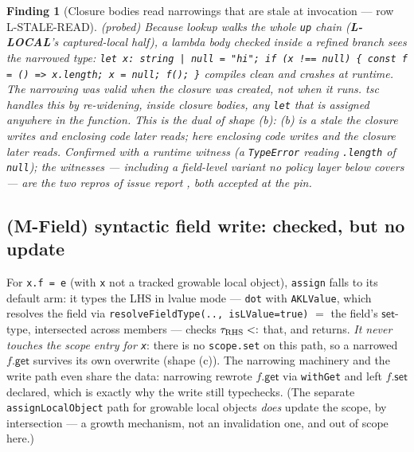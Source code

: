 \documentclass[11pt]{article}
\newtheorem{finding}[theorem]{Finding}
\begin{document}
\begin{finding}[Closure bodies read narrowings that are stale at invocation
— row L-STALE-READ]
\label{find:stale-read}
\emph{(probed)} Because lookup walks the whole \texttt{up} chain
(\textbf{L-LOCAL}'s captured-local half), a lambda body checked inside a
refined branch \emph{sees the narrowed type}:
\texttt{let x: string | null = "hi"; if (x !== null) \{ const f = () =>
x.length; x = null; f(); \}}
compiles clean and crashes at runtime. The narrowing was valid when the
closure was \emph{created}, not when it \emph{runs}. tsc handles this by
re-widening, inside closure bodies, any \texttt{let} that is assigned
anywhere in the function. This is the dual of shape (b): (b) is a stale
the closure writes and enclosing code later reads; here enclosing code
writes and the closure later reads. Confirmed with a runtime witness (a
\texttt{TypeError} reading \texttt{.length} of \texttt{null}); the
witnesses — including a field-level variant no policy layer below
covers — are the two repros of issue report
, both accepted at the
pin.
\end{finding}

\subsection{(M-Field) syntactic field write: checked, but no update}
For \texttt{x.f = e} (with \texttt{x} not a tracked growable local
object), \texttt{assign} falls to its default arm: it types the LHS in
lvalue mode — \texttt{dot} with \texttt{AKLValue}, which resolves the
field via \texttt{resolveFieldType(.., isLValue=true)} $=$ the field's
$\mathsf{set}$-type, intersected across members — checks
$\tau_{\rm RHS} <:$ that, and returns. \emph{It never touches the scope
entry for \texttt{x}}: there is no \texttt{scope.set} on this path, so a
narrowed $f.\mathsf{get}$ survives its own overwrite (shape (c)). The
narrowing machinery and the write path even share the data: narrowing
rewrote $f.\mathsf{get}$ via \texttt{withGet} and left $f.\mathsf{set}$
declared, which is exactly why the write still typechecks. (The separate
\texttt{assignLocalObject} path for growable local objects \emph{does}
update the scope, by intersection — a growth mechanism, not an
invalidation one, and out of scope here.)
\end{document}
